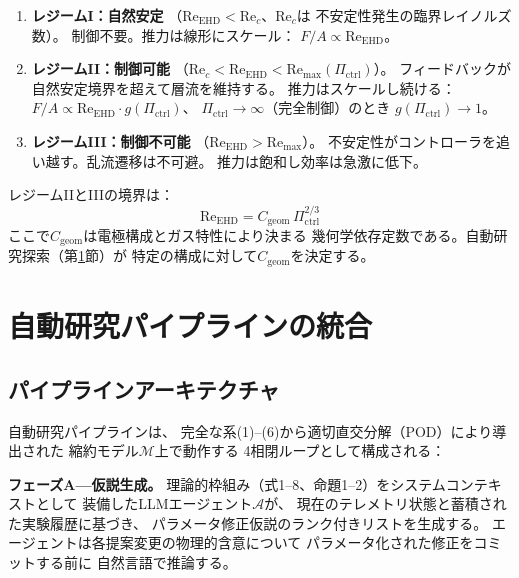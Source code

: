 \documentclass[12pt,twocolumn]{ltjsarticle}
\newcommand{\Reehd}{\mathrm{Re}_{\mathrm{EHD}}}
\newcommand{\Pctrl}{\Pi_{\mathrm{ctrl}}}
\begin{document}
\begin{enumerate}
  \item \textbf{レジームI：自然安定}
    （$\Reehd < \mathrm{Re}_c$、$\mathrm{Re}_c$は
    不安定性発生の臨界レイノルズ数）。
    制御不要。推力は線形にスケール：
    $F/A \propto \Reehd$。

  \item \textbf{レジームII：制御可能}
    （$\mathrm{Re}_c < \Reehd < \mathrm{Re}_{\max}(\Pctrl)$）。
    フィードバックが自然安定境界を超えて層流を維持する。
    推力はスケールし続ける：
    $F/A \propto \Reehd \cdot g(\Pctrl)$、
    $\Pctrl \to \infty$（完全制御）のとき
    $g(\Pctrl) \to 1$。

  \item \textbf{レジームIII：制御不可能}
    （$\Reehd > \mathrm{Re}_{\max}$）。
    不安定性がコントローラを追い越す。乱流遷移は不可避。
    推力は飽和し効率は急激に低下。
\end{enumerate}

レジームIIとIIIの境界は：
\begin{equation}
  \Reehd = C_{\mathrm{geom}}\,\Pctrl^{2/3}
  \label{eq:regime_boundary}
\end{equation}
ここで$C_{\mathrm{geom}}$は電極構成とガス特性により決まる
幾何学依存定数である。自動研究探索（第\ref{sec:autoresearch}節）が
特定の構成に対して$C_{\mathrm{geom}}$を決定する。

\section{自動研究パイプラインの統合}
\label{sec:autoresearch}

\subsection{パイプラインアーキテクチャ}
\label{sec:autoresearch:pipeline}

自動研究パイプライン\cite{Karpathy2025}は、
完全な系(1)--(6)から適切直交分解（POD）により導出された
縮約モデル$\mathcal{M}$上で動作する
4相閉ループとして構成される：

\textbf{フェーズA---仮説生成。}
理論的枠組み（式1--8、命題1--2）をシステムコンテキストとして
装備したLLMエージェント$\mathcal{A}$が、
現在のテレメトリ状態と蓄積された実験履歴に基づき、
パラメータ修正仮説のランク付きリストを生成する。
エージェントは各提案変更の物理的含意について
パラメータ化された修正をコミットする前に
自然言語で推論する。
\end{document}
